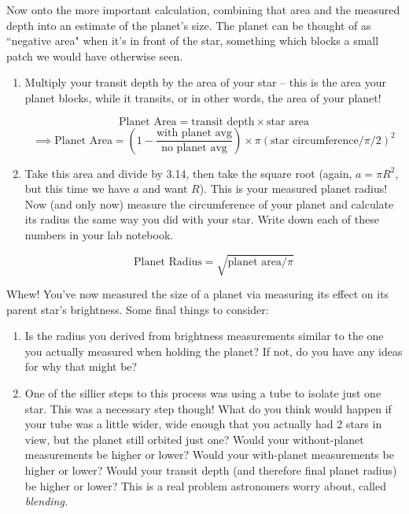 \documentclass[11pt]{article}
\begin{document}
\medskip \noindent
Now onto the more important calculation, combining that area and the measured depth into an estimate of the planet's size. The planet can be thought of as ``negative area" when it's in front of the star, something which blocks a small patch we would have otherwise seen. 
\begin{enumerate}[resume]
    \item Multiply your transit depth by the area of your star -- this is the area your planet blocks, while it transits, or in other words, the area of your planet!

    $$\text{Planet Area} = \text{transit depth} \times \text{star area}$$
    $$\implies \text{Planet Area} = \left(1 - \frac{\text{with planet avg}}{\text{no planet avg}} \right) \times \pi (\text{star circumference}/\pi/2)^2$$
    
    \item Take this area and divide by 3.14, then take the square root (again, $a = \pi R^2$, but this time we have $a$ and want $R$). This is your measured planet radius! Now (and only now) measure the circumference of your planet and calculate its radius the same way you did with your star. Write down each of these numbers in your lab notebook.

    $$\text{Planet Radius} = \sqrt{\text{planet area}/\pi}$$
\end{enumerate}


\medskip \noindent
Whew! You've now measured the size of a planet via measuring its effect on its parent star's brightness. Some final things to consider:
\begin{enumerate}[resume]
    \item Is the radius you derived from brightness measurements similar to the one you actually measured when holding the planet? If not, do you have any ideas for why that might be?
    \item One of the sillier steps to this process was using a tube to isolate just one star. This was a necessary step though! What do you think would happen if your tube was a little wider, wide enough that you actually had 2 stars in view, but the planet still orbited just one? Would your without-planet measurements be higher or lower? Would your with-planet measurements be higher or lower? Would your transit depth (and therefore final planet radius) be higher or lower? This is a real problem astronomers worry about, called {\it blending.}
\end{enumerate}
\end{document}
